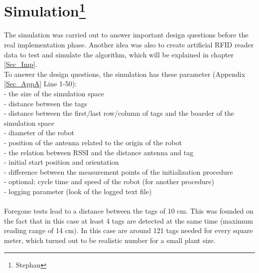 \section[Simulation]{Simulation\footnote{Stephan}}
The simulation was carried out to answer important design questions before the real implementation phase. Another idea was also to create artificial RFID reader data to test and simulate the algorithm, which will be explained in chapter \ref{Sec_Imp}. \\
To answer the design questions, the simulation has these parameter (Appendix \ref{Sec_AppA} Line 1-50):\\
- the size of the simulation space\\
- distance between the tags\\
- distance between the first/last row/column of tags and the boarder of the simulation space\\
- diameter of the robot\\
- position of the antenna related to the origin of the robot\\
- the relation between RSSI and the distance antenna and tag\\
- initial start position and orientation\\
- difference between the measurement points of the initialization procedure\\
- optional: cycle time and speed of the robot (for another procedure)\\
- logging parameter (look of the logged text file)\\
\\
Foregone tests lead to a distance between the tags of 10 cm. This was founded on the fact that in this case at least 4 tags are detected at the same time (maximum reading range of 14 cm). In this case are around 121 tags needed for every square meter, which turned out to be realistic number for a small plant size. \\

